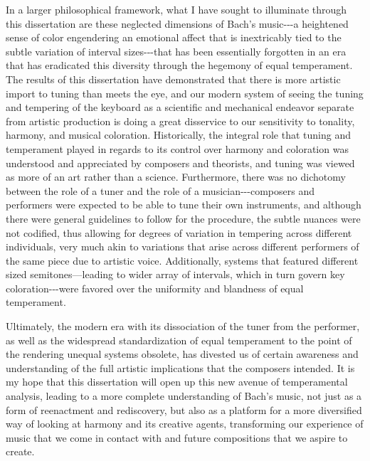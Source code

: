 In a larger philosophical framework, what I have sought to illuminate
through this dissertation are these neglected dimensions of Bach's
music-\/-\/-a heightened sense of color engendering an emotional affect
that is inextricably tied to the subtle variation of interval
sizes-\/-\/-that has been essentially forgotten in an era that has
eradicated this diversity through the hegemony of equal temperament. The
results of this dissertation have demonstrated that there is more
artistic import to tuning than meets the eye, and our modern system of
seeing the tuning and tempering of the keyboard as a scientific and
mechanical endeavor separate from artistic production is doing a great
disservice to our sensitivity to tonality, harmony, and musical
coloration. Historically, the integral role that tuning and temperament
played in regards to its control over harmony and coloration was
understood and appreciated by composers and theorists, and tuning was
viewed as more of an art rather than a science. Furthermore, there was
no dichotomy between the role of a tuner and the role of a
musician-\/-\/-composers and performers were expected to be able to tune
their own instruments, and although there were general guidelines to
follow for the procedure, the subtle nuances were not codified, thus
allowing for degrees of variation in tempering across different
individuals, very much akin to variations that arise across different
performers of the same piece due to artistic voice. Additionally,
systems that featured different sized semitones---leading to wider array
of intervals, which in turn govern key coloration-\/-\/-were favored
over the uniformity and blandness of equal temperament.

Ultimately, the modern era with its dissociation of the tuner from the
performer, as well as the widespread standardization of equal
temperament to the point of the rendering unequal systems obsolete, has
divested us of certain awareness and understanding of the full artistic
implications that the composers intended. It is my hope that this
dissertation will open up this new avenue of temperamental analysis,
leading to a more complete understanding of Bach's music, not just as a
form of reenactment and rediscovery, but also as a platform for a more
diversified way of looking at harmony and its creative agents,
transforming our experience of music that we come in contact with and
future compositions that we aspire to create.


    
    
    
